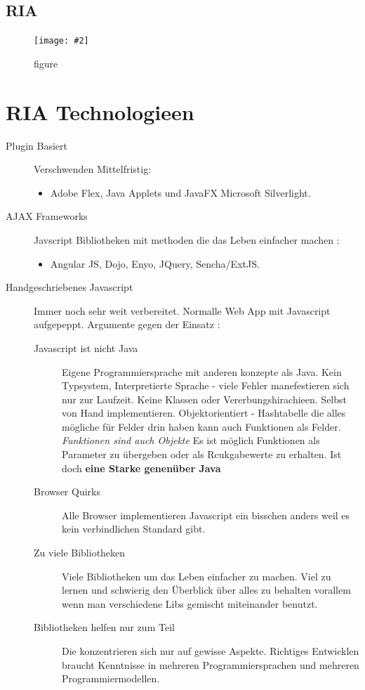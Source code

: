 \documentclass[a4paper,10pt]{scrreprt}
\newcommand{\pic}[2][figure]{\begin{figure}[h]
 \centering
 \texttt{[image: \#2]}
 \caption{#1}
\end{figure}
}
\begin{document}
\subsection{RIA}
\pic{ria3.png}


\section{RIA Technologieen}
\begin{description}
 \item [Plugin Basiert] Verschwenden Mittelfristig:
 \begin{itemize}
  \item Adobe Flex, Java Applets und JavaFX Microsoft Silverlight.
 \end{itemize}
\item[AJAX Frameworks] Javscript Bibliotheken mit methoden die das Leben einfacher machen :
\begin{itemize}
 \item Angular JS, Dojo, Enyo, JQuery, Sencha/ExtJS.
\end{itemize}
\item[Handgeschriebenes Javascript] Immer noch sehr weit verbereitet. Normalle Web App mit Javascript aufgepeppt. 
Argumente gegen der Einsatz :
\begin{description}
 \item [Javascript ist nicht Java] Eigene Programmiersprache mit anderen konzepte als Java. Kein Typsystem, 
Interpretierte Sprache - viele Fehler manefestieren sich nur zur Laufzeit. Keine Klassen oder Vererbungshirachieen. 
Selbst von Hand implementieren. Objektorientiert - Hashtabelle die alles mögliche für Felder drin haben kann auch 
Funktionen als Felder. \textit{Funktionen sind auch Objekte} Es ist möglich Funktionen als Parameter zu übergeben oder 
als Rcukgabewerte zu erhalten. Ist doch \textbf{eine Starke genenüber Java}
\item[Browser Quirks] Alle Browser implementieren Javascript ein bisschen anders weil es kein verbindlichen Standard 
gibt.
\item[Zu viele Bibliotheken] Viele Bibliotheken um das Leben einfacher zu machen. Viel zu lernen und schwierig den 
Überblick über alles zu behalten vorallem wenn man verschiedene Libs gemischt miteinander benutzt.
\item[Bibliotheken helfen nur zum Teil] Die konzentrieren sich nur auf gewisse Aspekte. Richtiges Entwicklen braucht 
Kenntnisse in mehreren Programmiersprachen und mehreren Programmiermodellen.

\end{description}
\end{description}
\end{document}
